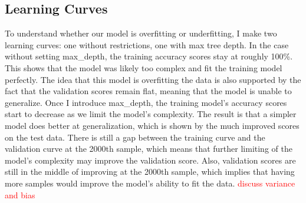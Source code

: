 \documentclass{article}
\newcommand\todo[1]{\textcolor{red}{#1}}
\begin{document}
\subsection*{Learning Curves}

To understand whether our model is overfitting or underfitting, I make two learning curves: one without restrictions, one with max tree depth. In the case without setting max\_depth, the training accuracy scores stay at roughly 100\%. This shows that the model was likely too complex and fit the training model perfectly. The idea that this model is overfitting the data is also supported by the fact that the validation scores remain flat, meaning that the model is unable to generalize. Once I introduce max\_depth, the training model's accuracy scores start to decrease as we limit the model's complexity. The result is that a simpler model does better at generalization, which is shown by the much improved scores on the test data. There is still a gap between the training curve and the validation curve at the 2000th sample, which means that further limiting of the model's complexity may improve the validation score. Also, validation scores are still in the middle of improving at the 2000th sample, which implies that having more samples would improve the model's ability to fit the data. \todo{discuss variance and bias}
\end{document}
